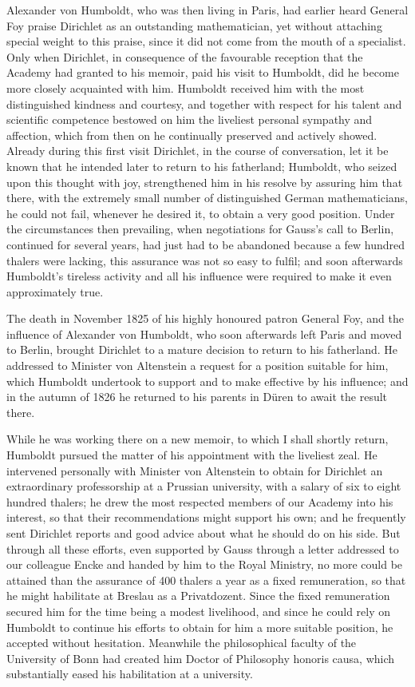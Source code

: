 \documentclass[11pt]{article}
\begin{document}
Alexander von Humboldt, who was then living in Paris, had earlier heard General Foy praise Dirichlet as an outstanding mathematician, yet without attaching special weight to this praise, since it did not come from the mouth of a specialist. Only when Dirichlet, in consequence of the favourable reception that the Academy had granted to his memoir, paid his visit to Humboldt, did he become more closely acquainted with him. Humboldt received him with the most distinguished kindness and courtesy, and together with respect for his talent and scientific competence bestowed on him the liveliest personal sympathy and affection, which from then on he continually preserved and actively showed. Already during this first visit Dirichlet, in the course of conversation, let it be known that he intended later to return to his fatherland; Humboldt, who seized upon this thought with joy, strengthened him in his resolve by assuring him that there, with the extremely small number of distinguished German mathematicians, he could not fail, whenever he desired it, to obtain a very good position. Under the circumstances then prevailing, when negotiations for Gauss's call to Berlin, continued for several years, had just had to be abandoned because a few hundred thalers were lacking, this assurance was not so easy to fulfil; and soon afterwards Humboldt's tireless activity and all his influence were required to make it even approximately true.

The death in November 1825 of his highly honoured patron General Foy, and the influence of Alexander von Humboldt, who soon afterwards left Paris and moved to Berlin, brought Dirichlet to a mature decision to return to his fatherland. He addressed to Minister von Altenstein a request for a position suitable for him, which Humboldt undertook to support and to make effective by his influence; and in the autumn of 1826 he returned to his parents in Düren to await the result there.

While he was working there on a new memoir, to which I shall shortly return, Humboldt pursued the matter of his appointment with the liveliest zeal. He intervened personally with Minister von Altenstein to obtain for Dirichlet an extraordinary professorship at a Prussian university, with a salary of six to eight hundred thalers; he drew the most respected members of our Academy into his interest, so that their recommendations might support his own; and he frequently sent Dirichlet reports and good advice about what he should do on his side. But through all these efforts, even supported by Gauss through a letter addressed to our colleague Encke and handed by him to the Royal Ministry, no more could be attained than the assurance of 400 thalers a year as a fixed remuneration, so that he might habilitate at Breslau as a Privatdozent. Since the fixed remuneration secured him for the time being a modest livelihood, and since he could rely on Humboldt to continue his efforts to obtain for him a more suitable position, he accepted without hesitation. Meanwhile the philosophical faculty of the University of Bonn had created him Doctor of Philosophy honoris causa, which substantially eased his habilitation at a university.
\end{document}
